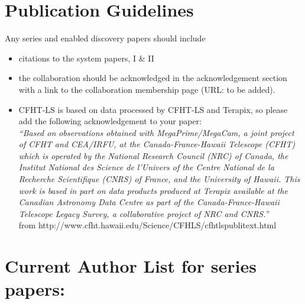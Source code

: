 \documentclass[a4paper]{article}
\begin{document}


\section{Publication Guidelines}
\label{sec:publ}

Any \sw series and \sw enabled discovery papers should include
\begin{itemize}
\item citations to the \sw system papers, \sw I \& II
\item the collaboration should be acknowledged in the acknowledgement section with a link to the collaboration membership page (URL: to be added).
\item \sw CFHT-LS is based on data processed by CFHT-LS and Terapix, so please add the following acknowledgement to your paper:\\
\textit{``Based on observations obtained with MegaPrime/MegaCam, a joint project of CFHT and CEA/IRFU, at the Canada-France-Hawaii Telescope (CFHT) which is operated by the National Research Council (NRC) of Canada, the Institut National des Science de l'Univers of the Centre National de la Recherche Scientifique (CNRS) of France, and the University of Hawaii. This work is based in part on data products produced at Terapix available at the Canadian Astronomy Data Centre as part of the Canada-France-Hawaii Telescope Legacy Survey, a collaborative project of NRC and CNRS.''}\\
from http://www.cfht.hawaii.edu/Science/CFHLS/cfhtlspublitext.html

\end{itemize}


\appendix
\section{Current Author List for \sw series papers:}
\label{sec:appa}
{\small }

\end{document}
